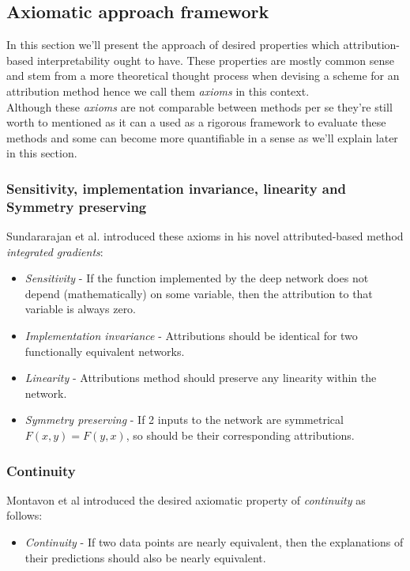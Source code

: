 \documentclass[12pt]{report}
\begin{document}
\newpage
\subsection{Axiomatic approach framework}

In this section we'll present the approach of desired properties which attribution-based interpretability ought to have. These properties are mostly common sense and stem from a more theoretical thought process when devising a scheme for an attribution method hence we call them \textit{axioms} in this context. \\ 

Although these \textit{axioms} are not comparable between methods per se they're still worth to mentioned as it can a used as a rigorous framework to evaluate these methods and some can become more quantifiable in a sense as we'll explain later in this section. \\

\subsubsection{Sensitivity, implementation invariance, linearity and Symmetry preserving}

Sundararajan et al. \cite{DBLP:journals/corr/SundararajanTY17} introduced these axioms in his novel attributed-based method \textit{integrated gradients}:
\begin{itemize}
	\item \textit{Sensitivity} -  If the function implemented by the deep network does not depend (mathematically) on some variable, then the attribution to that variable is always zero.
	\item \textit{Implementation invariance} - Attributions should be identical for two functionally equivalent networks.
	\item \textit{Linearity} - Attributions method should preserve any linearity within the network.
	\item \textit{Symmetry preserving} - If 2 inputs to the network are symmetrical $F(x,y)=F(y,x)$, so should be their corresponding attributions. 
\end{itemize}

\subsubsection{Continuity}
Montavon et al \cite{DBLP:journals/corr/MontavonSM17} introduced the desired axiomatic property of \textit{continuity} as follows:
\begin{itemize}
	\item \textit{Continuity} - If two data points are nearly equivalent, then the explanations of their predictions should also be	nearly equivalent.
\end{itemize}
\end{document}
